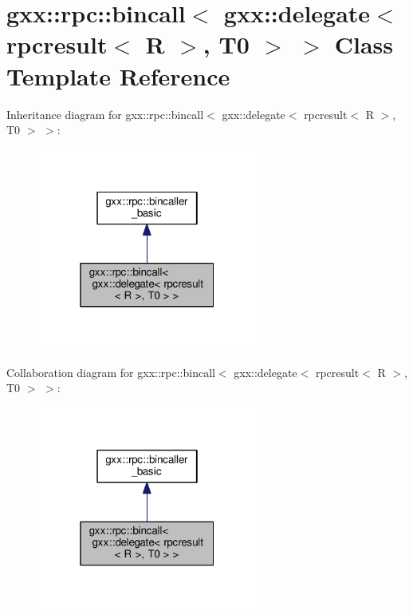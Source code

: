 \hypertarget{classgxx_1_1rpc_1_1bincall_3_01gxx_1_1delegate_3_01rpcresult_3_01R_01_4_00_01T0_01_4_01_4}{}\section{gxx\+:\+:rpc\+:\+:bincall$<$ gxx\+:\+:delegate$<$ rpcresult$<$ R $>$, T0 $>$ $>$ Class Template Reference}
\label{classgxx_1_1rpc_1_1bincall_3_01gxx_1_1delegate_3_01rpcresult_3_01R_01_4_00_01T0_01_4_01_4}


Inheritance diagram for gxx\+:\+:rpc\+:\+:bincall$<$ gxx\+:\+:delegate$<$ rpcresult$<$ R $>$, T0 $>$ $>$\+:
\nopagebreak
\begin{figure}[H]
\begin{center}
\leavevmode
\includegraphics[width=205pt]{classgxx_1_1rpc_1_1bincall_3_01gxx_1_1delegate_3_01rpcresult_3_01R_01_4_00_01T0_01_4_01_4__inherit__graph}
\end{center}
\end{figure}


Collaboration diagram for gxx\+:\+:rpc\+:\+:bincall$<$ gxx\+:\+:delegate$<$ rpcresult$<$ R $>$, T0 $>$ $>$\+:
\nopagebreak
\begin{figure}[H]
\begin{center}
\leavevmode
\includegraphics[width=205pt]{classgxx_1_1rpc_1_1bincall_3_01gxx_1_1delegate_3_01rpcresult_3_01R_01_4_00_01T0_01_4_01_4__coll__graph}
\end{center}
\end{figure}
